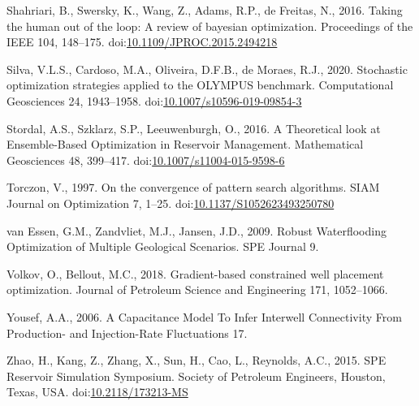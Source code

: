 \documentclass[]{elsarticle} %
\newlength{\cslhangindent}
\newenvironment{CSLReferences}[2] %
 {%
  \setlength{\parindent}{0pt}
  \ifodd #1 \everypar{\setlength{\hangindent}{\cslhangindent}}\ignorespaces\fi
  \ifnum #2 > 0
  \setlength{\parskip}{#2\baselineskip}
  \fi
 }%
 {}
\begin{document}
\begin{CSLReferences}{1}{0}
\leavevmode{}%
Shahriari, B., Swersky, K., Wang, Z., Adams, R.P., de Freitas, N., 2016. Taking the human out of the loop: A review of bayesian optimization. Proceedings of the IEEE 104, 148--175. doi:\href{https://doi.org/10.1109/JPROC.2015.2494218}{10.1109/JPROC.2015.2494218}

\leavevmode{}%
Silva, V.L.S., Cardoso, M.A., Oliveira, D.F.B., de Moraes, R.J., 2020. Stochastic optimization strategies applied to the OLYMPUS benchmark. Computational Geosciences 24, 1943--1958. doi:\href{https://doi.org/10.1007/s10596-019-09854-3}{10.1007/s10596-019-09854-3}

\leavevmode{}%
Stordal, A.S., Szklarz, S.P., Leeuwenburgh, O., 2016. A Theoretical look at Ensemble-Based Optimization in Reservoir Management. Mathematical Geosciences 48, 399--417. doi:\href{https://doi.org/10.1007/s11004-015-9598-6}{10.1007/s11004-015-9598-6}

\leavevmode{}%
Torczon, V., 1997. On the convergence of pattern search algorithms. SIAM Journal on Optimization 7, 1--25. doi:\href{https://doi.org/10.1137/S1052623493250780}{10.1137/S1052623493250780}

\leavevmode{}%
van Essen, G.M., Zandvliet, M.J., Jansen, J.D., 2009. Robust Waterflooding Optimization of Multiple Geological Scenarios. SPE Journal 9.

\leavevmode{}%
Volkov, O., Bellout, M.C., 2018. Gradient-based constrained well placement optimization. Journal of Petroleum Science and Engineering 171, 1052--1066.

\leavevmode{}%
Yousef, A.A., 2006. A Capacitance Model To Infer Interwell Connectivity From Production- and Injection-Rate Fluctuations 17.

\leavevmode{}%
Zhao, H., Kang, Z., Zhang, X., Sun, H., Cao, L., Reynolds, A.C., 2015. SPE Reservoir Simulation Symposium. Society of Petroleum Engineers, Houston, Texas, USA. doi:\href{https://doi.org/10.2118/173213-MS}{10.2118/173213-MS}

\end{CSLReferences}
\end{document}
